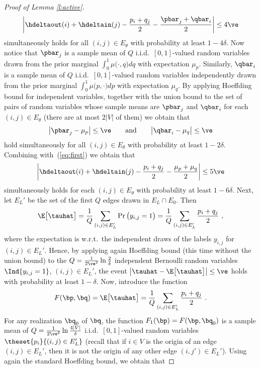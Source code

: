 \begin{proof}[Proof of Lemma \ref{l:active}]
\begin{equation}
\label{eq:first}
	\left| \hdeltaout(i) + \hdeltain(j) - \frac{p_i + q_j}{2} - \frac{\pbar_j + \qbar_i}{2} \right| \le 4\ve
\end{equation}
simultaneously holds for all $(i,j) \in E_{\theta}$ with probability at least $1 - 4\delta$. Now notice that $\pbar_j$ is a sample mean of $Q$ i.i.d.\ $[0,1]$-valued random variables drawn from the prior marginal $\int_0^1 \mu\big(\cdot,q\bigr) dq$ with expectation $\mu_p$. Similarly, $\qbar_i$ is a sample mean of $Q$ i.i.d.\ $[0,1]$-valued random variables independently drawn from the prior marginal $\int_0^1 \mu\big(p,\cdot\big) dp$ with expectation $\mu_q$. By applying Hoeffding bound for independent variables, together with the union bound to the set of pairs of random variables whose sample means are $\pbar_j$ and $\qbar_i$ for each $(i,j) \in E_{\theta}$ (there are at most $2|V|$ of them) we obtain that
\begin{align*}
	\big|\pbar_j - \mu_p\big| \le \ve
\qquad\text{and}\qquad
	\big|\qbar_i - \mu_q\big| \le \ve
\end{align*}
hold simultaneously for all $(i,j) \in E_{\theta}$ with probability at least $1-2\delta$. Combining with~(\ref{eq:first}) we obtain that
\begin{equation}
\label{eq:this}
	\left| \hdeltaout(i) + \hdeltain(j) - \frac{p_i + q_j}{2} - \frac{\mu_p + \mu_q}{2} \right| \le 5\ve
\end{equation}
simultaneously holds for each $(i,j) \in E_{\theta}$ with probability at least $1 - 6\delta$. Next, let $E_L'$ be the set of the first $Q$ edges drawn in $E_L \cap E_0$. Then
\[
	\E\big[\tauhat\big] = \frac{1}{Q}\sum_{(i,j) \in E_L'} \Pr\big(y_{i,j} = 1\big) = \frac{1}{Q}\sum_{(i,j) \in E_L'} \frac{p_i+q_j}{2}~,
\]
where the expectation is w.r.t.\ the independent draws of the labels $y_{i,j}$ for $(i,j) \in E_L'$. Hence, by applying again Hoeffding bound (this time without the union bound) to the $Q = \tfrac{1}{2\ve^2}\ln\tfrac{2}{\delta}$ independent Bernoulli random variables $\Ind{y_{i,j} = 1}$, $(i,j) \in E_L'$, the event
$
	\big| \tauhat - \E\big[\tauhat\big] \big| \le \ve
$
holds with probability at least $1-\delta$. Now, introduce the function
\[
	F(\bp,\bq) = \E\big[\tauhat\big] = \frac{1}{Q}\sum_{(i,j) \in E_L'} \frac{p_i+q_j}{2}~.
\]
For any realization $\bq_0$ of $\bq$, the function $F_1(\bp) = F(\bp,\bq_0)$ is a sample mean of $Q = \tfrac{1}{2\ve^2}\ln\tfrac{4|V|}{\delta}$ i.i.d.\ $[0,1]$-valued random variables $\theset{p_i}{(i,j) \in E_L'}$ (recall that if $i \in V$ is the origin of an edge $(i,j) \in E_L'$, then it is not the origin of any other edge $(i,j') \in E_L'$). Using again the standard Hoeffding bound, we obtain that

\end{proof}
